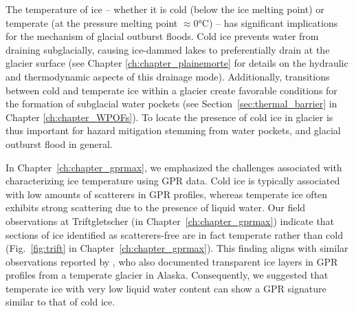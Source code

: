 The temperature of ice -- whether it is cold (below the ice melting point) or temperate (at the pressure melting point $\approx$0°C) -- has significant implications for the mechanism of glacial outburst floods. Cold ice prevents water from draining subglacially, causing ice-dammed lakes to preferentially drain at the glacier surface (see Chapter \ref{ch:chapter_plainemorte} for details on the hydraulic and thermodynamic aspects of this drainage mode). Additionally, transitions between cold and temperate ice within a glacier create favorable conditions for the formation of subglacial water pockets (see Section~\ref{sec:thermal_barrier} in Chapter \ref{ch:chapter_WPOFs}). To locate the presence of cold ice in glacier is thus important for hazard mitigation stemming from water pockets, and glacial outburst flood in general. 

In Chapter~\ref{ch:chapter_gprmax}, we emphasized the challenges associated with characterizing ice temperature using GPR data. Cold ice is typically associated with low amounts of scatterers in GPR profiles, whereas temperate ice often exhibits strong scattering due to the presence of liquid water. Our field observations at Triftgletscher (in Chapter~\ref{ch:chapter_gprmax}) indicate that sections of ice identified as scatterers-free are in fact temperate rather than cold (Fig.~\ref{fig:trift} in Chapter~\ref{ch:chapter_gprmax}). This finding aligns with similar observations reported by \cite{Brown&al2009}, who also documented transparent ice layers in GPR profiles from a temperate glacier in Alaska. Consequently, we suggested that temperate ice with very low liquid water content can show a GPR signature similar to that of cold ice. 

